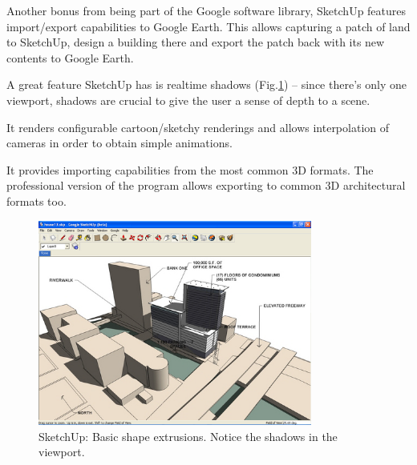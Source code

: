 Another bonus from being part of the Google software library, SketchUp features import/export capabilities to Google Earth\cite{SITE-EARTH}.
This allows capturing a patch of land to SketchUp, design a building there and export the patch
back with its new contents to Google Earth.

A great feature SketchUp has is realtime shadows (Fig.\ref{FIG-SKETCHUP}) -- since there's only one viewport, shadows are crucial to give the user a sense of depth to a scene.

It renders configurable cartoon/sketchy renderings and allows interpolation of cameras
in order to obtain simple animations.

It provides importing capabilities from the most common 3D formats.
The professional version of the program allows exporting to common 3D architectural formats too.


\begin{figure}[!ht]
    \centering
    \includegraphics[width=9cm]{gfx/sketchup-1.png}
    \caption{SketchUp: Basic shape extrusions. Notice the shadows in the viewport.}
    \label{FIG-SKETCHUP}
\end{figure}

\newpage

